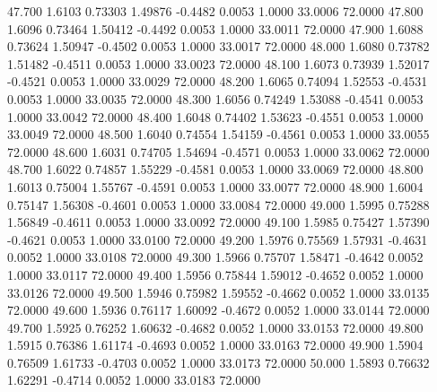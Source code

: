   47.700   1.6103   0.73303   1.49876  -0.4482   0.0053   1.0000  33.0006  72.0000
  47.800   1.6096   0.73464   1.50412  -0.4492   0.0053   1.0000  33.0011  72.0000
  47.900   1.6088   0.73624   1.50947  -0.4502   0.0053   1.0000  33.0017  72.0000
  48.000   1.6080   0.73782   1.51482  -0.4511   0.0053   1.0000  33.0023  72.0000
  48.100   1.6073   0.73939   1.52017  -0.4521   0.0053   1.0000  33.0029  72.0000
  48.200   1.6065   0.74094   1.52553  -0.4531   0.0053   1.0000  33.0035  72.0000
  48.300   1.6056   0.74249   1.53088  -0.4541   0.0053   1.0000  33.0042  72.0000
  48.400   1.6048   0.74402   1.53623  -0.4551   0.0053   1.0000  33.0049  72.0000
  48.500   1.6040   0.74554   1.54159  -0.4561   0.0053   1.0000  33.0055  72.0000
  48.600   1.6031   0.74705   1.54694  -0.4571   0.0053   1.0000  33.0062  72.0000
  48.700   1.6022   0.74857   1.55229  -0.4581   0.0053   1.0000  33.0069  72.0000
  48.800   1.6013   0.75004   1.55767  -0.4591   0.0053   1.0000  33.0077  72.0000
  48.900   1.6004   0.75147   1.56308  -0.4601   0.0053   1.0000  33.0084  72.0000
  49.000   1.5995   0.75288   1.56849  -0.4611   0.0053   1.0000  33.0092  72.0000
  49.100   1.5985   0.75427   1.57390  -0.4621   0.0053   1.0000  33.0100  72.0000
  49.200   1.5976   0.75569   1.57931  -0.4631   0.0052   1.0000  33.0108  72.0000
  49.300   1.5966   0.75707   1.58471  -0.4642   0.0052   1.0000  33.0117  72.0000
  49.400   1.5956   0.75844   1.59012  -0.4652   0.0052   1.0000  33.0126  72.0000
  49.500   1.5946   0.75982   1.59552  -0.4662   0.0052   1.0000  33.0135  72.0000
  49.600   1.5936   0.76117   1.60092  -0.4672   0.0052   1.0000  33.0144  72.0000
  49.700   1.5925   0.76252   1.60632  -0.4682   0.0052   1.0000  33.0153  72.0000
  49.800   1.5915   0.76386   1.61174  -0.4693   0.0052   1.0000  33.0163  72.0000
  49.900   1.5904   0.76509   1.61733  -0.4703   0.0052   1.0000  33.0173  72.0000
  50.000   1.5893   0.76632   1.62291  -0.4714   0.0052   1.0000  33.0183  72.0000
